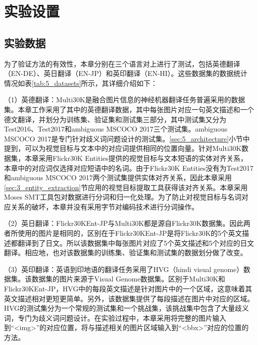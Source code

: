 \section{实验设置}
\label{sec:5_setup}

\subsection{实验数据}
\label{sec:5_datasets}

为了验证方法的有效性，本章分别在三个语言对上进行了测试，包括英德翻译（EN-DE）、英日翻译（EN-JP）和英印翻译（EN-HI）。这些数据集的数据统计情况如表\ref{tab:5_datasets}所示，其详细介绍如下：

（1）{\sffamily 英德翻译：}Multi30K是融合图片信息的神经机器翻译任务普遍采用的数据集。本章工作采用了其中的英德翻译数据，其中每张图片对应一句英文描述和一个德文翻译，并划分为训练集、验证集和测试集三部分，其中测试集又分为Test2016、Test2017和ambiguous MSCOCO 2017三个测试集。ambiguous MSCOCO 2017是专门针对歧义词问题设计的测试集。\ref{sec:5_architecture}小节中提到，可以为视觉目标与文本中的对应词提供相同的位置向量。针对Multi30K数据集，本章采用Flickr30K Entities提供的视觉目标与文本短语的实体对齐关系，本章中的对应词仅选择对应短语中的名词。由于Flickr30K Entities没有为Test2017和ambiguous MSCOCO 2017两个测试集提供实体对齐关系，因此本章采用\ref{sec:3_entity_extraction}节应用的视觉目标提取工具获得该对齐关系。本章采用Moses SMT工具包对数据进行分词和归一化处理。为了防止对视觉目标与名词对应关系的破坏，本章并没有采用字节对编码技术进行分词操作。

（2）{\sffamily 英日翻译：}Flickr30KEnt-JP与Multi30K都是源自Flickr30K数据集。因此两者所使用的图片是相同的，区别在于Flickr30KEnt-JP是将Flickr30K的5个英文描述都翻译到了日文。所以该数据集中每张图片对应了5个英文描述和5个对应的日文翻译。相应地，也对该数据集的训练集、验证集和测试集的数据划分做了改变。

（3）{\sffamily 英印翻译：}英语到印地语的翻译任务采用了HVG（hindi visual genome）数据集。该数据集的图片来源于Visual Genome数据集。区别于Multi30K和Flickr30KEnt-JP，HVG中的每段英文描述是针对图片中的一个区域，这意味着其英文描述相对更短更简单。另外，该数据集提供了每段描述在图片中对应的区域。HVG的测试集分为一个常规的测试集和一个挑战集，该挑战集中包含了大量歧义词，专门为歧义词问题设计。在实验过程中，本章采用将完整的图片输入到“<img>”的对应位置，将与描述相关的图片区域输入到“<bbx>”对应的位置的方法。

